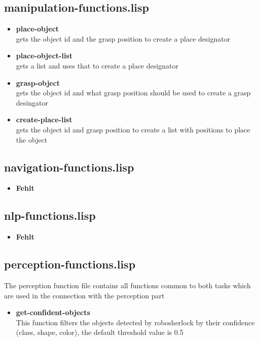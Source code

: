 \documentclass[main.tex]{subfiles}
\begin{document}
	    \subsection{manipulation-functions.lisp}
	    \begin{itemize}
	    \item \textbf{place-object} \\
	    gets the object id and the grasp position to create a place designator  
		\item \textbf{place-object-list} \\
		gets a list and uses that to create a place designator 
	    \item \textbf{grasp-object} \\
	    gets the object id and what grasp position should be used to create a grasp desingator
	    \item \textbf{create-place-list} \\
	    gets the object id and grasp position to create a list with positions to place the object
		\end{itemize}
	    \subsection{navigation-functions.lisp}
	    \begin{itemize}
	    	\item \textbf{Fehlt} \\
	    \end{itemize}
	    \subsection{nlp-functions.lisp}
	    \begin{itemize}
	    	\item \textbf{Fehlt} \\
	    \end{itemize}
	    \subsection{perception-functions.lisp}
	    The perception function file contains all functions common to both tasks which are used in the connection with the perception part
	    \begin{itemize}
	    	\item \textbf{get-confident-objects} \\
	    	This function filters the objects detected by robosherlock by their confidence (class, shape, color), the default threshold value is 0.5
	    \end{itemize}
\end{document}
